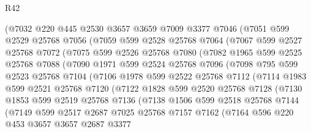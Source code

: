 \begin{lexlean}{R42}
\begin{coremodule}
      (@7032
        @220
        @445
        @2530
        @3657
        @3659
        @7009
        @3377
        @7046
        (@7051
          @599
          @2529
          @25768
          @7056
          (@7059
            @599
            @2528
            @25768
            @7064
            (@7067
              @599
              @2527
              @25768
              @7072
              (@7075
                @599
                @2526
                @25768
                @7080
                (@7082
                  @1965
                  @599
                  @2525
                  @25768
                  @7088
                  (@7090
                    @1971
                    @599
                    @2524
                    @25768
                    @7096
                    (@7098
                      @795
                      @599
                      @2523
                      @25768
                      @7104
                      (@7106
                        @1978
                        @599
                        @2522
                        @25768
                        @7112
                        (@7114
                          @1983
                          @599
                          @2521
                          @25768
                          @7120
                          (@7122
                            @1828
                            @599
                            @2520
                            @25768
                            @7128
                            (@7130
                              @1853
                              @599
                              @2519
                              @25768
                              @7136
                              (@7138
                                @1506
                                @599
                                @2518
                                @25768
                                @7144
                                (@7149
                                  @599
                                  @2517
                                  @2687
                                  @7025
                                  @25768
                                  @7157
                                  @7162
                                  (@7164
                                    @596
                                    @220
                                    @453
                                    @3657
                                    @3657
                                    @2687
                                    @3377

\end{coremodule}
\end{lexlean}
